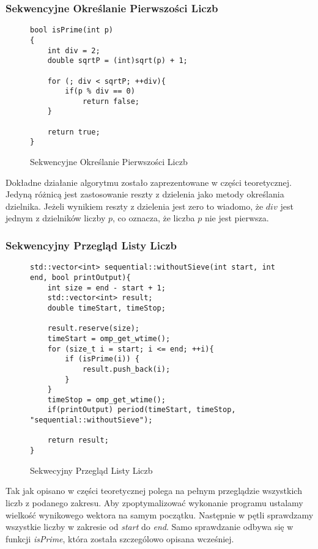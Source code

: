 \documentclass{article}
\begin{document}
            \subsubsection{Sekwencyjne Określanie Pierwszości Liczb}
                \begin{figure}[H]
                    \begin{verbatim}
bool isPrime(int p)
{
	int div = 2;
	double sqrtP = (int)sqrt(p) + 1;

	for (; div < sqrtP; ++div){ 
		if(p % div == 0) 
			return false;
	}

	return true;
}
                    \end{verbatim}
                    \caption{Sekwencyjne Określanie Pierwszości Liczb}
                \end{figure}
                Dokładne działanie algorytmu zostało zaprezentowane w części teoretycznej. Jedyną różnicą jest zastosowanie reszty z dzielenia jako metody określania dzielnika. Jeżeli wynikiem reszty z dzielenia jest zero to wiadomo, że $div$ jest jednym z dzielników liczby $p$, co oznacza, że liczba $p$ nie jest pierwsza.
                
            \subsubsection{Sekwencyjny Przegląd Listy Liczb}
                \begin{figure}[H]
                    \begin{verbatim}
std::vector<int> sequential::withoutSieve(int start, int end, bool printOutput){
    int size = end - start + 1;
    std::vector<int> result;
    double timeStart, timeStop;
                
    result.reserve(size);
    timeStart = omp_get_wtime();
    for (size_t i = start; i <= end; ++i){
        if (isPrime(i)) {
            result.push_back(i);
        }
    }
    timeStop = omp_get_wtime();
    if(printOutput) period(timeStart, timeStop, "sequential::withoutSieve");
                
    return result;
}
                    \end{verbatim}
                    \caption{Sekwecyjny Przegląd Listy Liczb}
                \end{figure}
                Tak jak opisano w części teoretycznej polega na pełnym przeglądzie wszystkich liczb z podanego zakresu. Aby zpoptymalizować wykonanie programu ustalamy wielkość wynikowego wektora na samym początku. Następnie w pętli sprawdzamy wszystkie liczby w zakresie od \emph{start} do \emph{end}. Samo sprawdzanie odbywa się w funkcji \emph{isPrime}, która została szczególowo opisana wcześniej.
\end{document}
